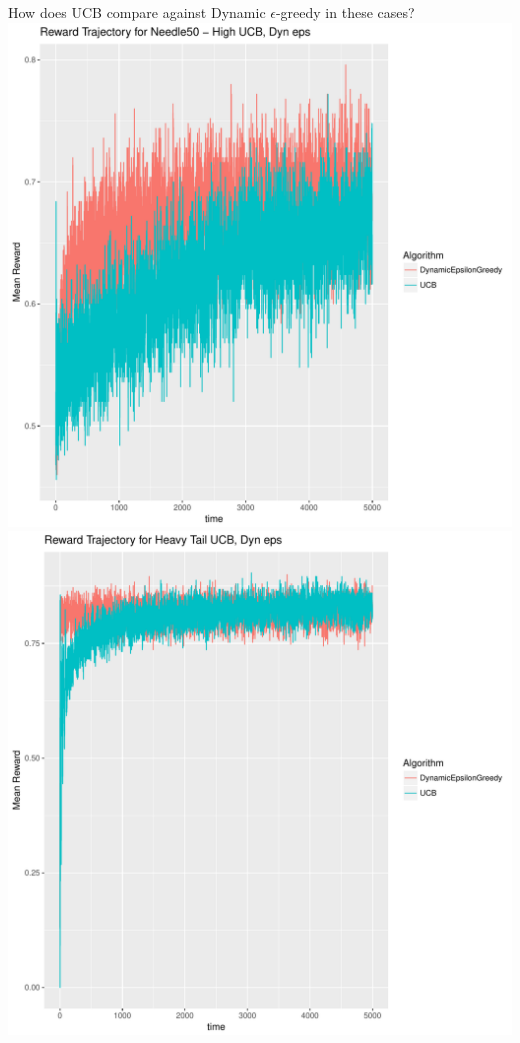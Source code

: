 \documentclass[11pt,letterpaper]{article}
\begin{document}
How does UCB compare against Dynamic $\epsilon$-greedy in these cases? \\
\includegraphics[scale=0.5]{"../results/Reward Trajectory for Needle50 - High UCB, Dyn eps"} \\
\includegraphics[scale=0.5]{"../results/Reward Trajectory for Heavy Tail UCB, Dyn eps"} \\
\end{document}
